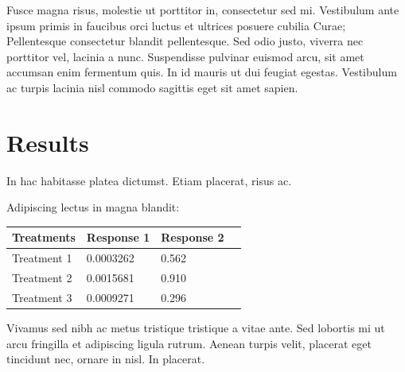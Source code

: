 \documentclass[a0,portrait]{a0poster}
\begin{document}
\begin{multicols}{2}
Fusce magna risus, molestie ut porttitor in, consectetur sed
mi. Vestibulum ante ipsum primis in faucibus orci luctus et ultrices
posuere cubilia Curae; Pellentesque consectetur blandit
pellentesque. Sed odio justo, viverra nec porttitor vel, lacinia a
nunc. Suspendisse pulvinar euismod arcu, sit amet accumsan enim
fermentum quis. In id mauris ut dui feugiat egestas. Vestibulum ac
turpis lacinia nisl commodo sagittis eget sit amet sapien.



\section*{Results}


\begin{center}\vspace{1cm}
\end{center}\vspace{1cm}

In hac habitasse platea dictumst. Etiam placerat, risus ac.

Adipiscing lectus in magna blandit:

\begin{center}\vspace{1cm}
\begin{tabular}{l l l l}
\toprule
\textbf{Treatments} & \textbf{Response 1} & \textbf{Response 2} \\
\midrule
Treatment 1 & 0.0003262 & 0.562 \\
Treatment 2 & 0.0015681 & 0.910 \\
Treatment 3 & 0.0009271 & 0.296 \\
\bottomrule
\end{tabular}
\end{center}\vspace{1cm}

Vivamus sed nibh ac metus tristique tristique a vitae ante. Sed
lobortis mi ut arcu fringilla et adipiscing ligula rutrum. Aenean
turpis velit, placerat eget tincidunt nec, ornare in nisl. In
placerat.

\begin{center}\vspace{1cm}
\end{center}\vspace{1cm}


\end{multicols}
\end{document}
